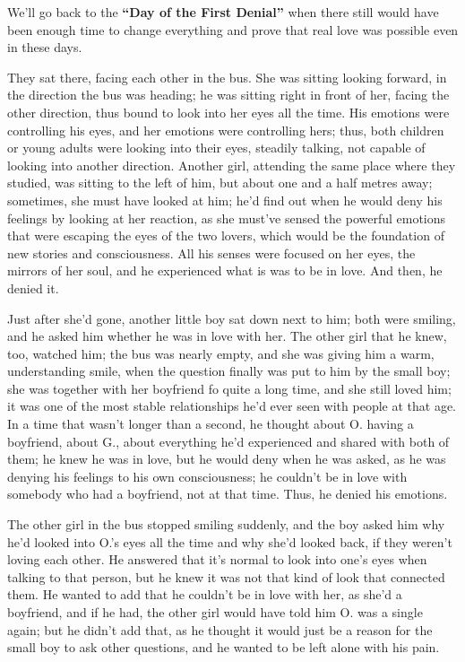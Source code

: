 We'll go back to the \textbf{\enquote{Day of the First Denial}} when there still would have been enough time to change everything and prove that real love was possible even in these days.

They sat there, facing each other in the bus. She was sitting looking forward, in the direction the bus was heading; he was sitting right in front of her, facing the other direction, thus bound to look into her eyes all the time. His emotions were controlling his eyes, and her emotions were controlling hers; thus, both children or young adults were looking into their eyes, steadily talking, not capable of looking into another direction. Another girl, attending the same place where they studied, was sitting to the left of him, but about one and a half metres away; sometimes, she must have looked at him; he'd find out when he would deny his feelings by looking at her reaction, as she must've sensed the powerful emotions that were escaping the eyes of the two lovers, which would be the foundation of new stories and consciousness. All his senses were focused on her eyes, the mirrors of her soul, and he experienced what is was to be in love.
And then, he denied it.

Just after she'd gone, another little boy sat down next to him; both were smiling, and he asked him whether he was in love with her. The other girl that he knew, too, watched him; the bus was nearly empty, and she was giving him a warm, understanding smile, when the question finally was put to him by the small boy; she was together with her boyfriend fo quite a long time, and she still loved him; it was one of the most stable relationships he'd ever seen with people at that age. In a time that wasn't longer than a second, he thought about O. having a boyfriend, about G., about everything he'd experienced and shared with both of them; he knew he was in love, but he would deny when he was asked, as he was denying his feelings to his own consciousness; he couldn't be in love with somebody who had a boyfriend, not at that time.
Thus, he denied his emotions.

The other girl in the bus stopped smiling suddenly, and the boy asked him why he'd looked into O.'s eyes all the time and why she'd looked back, if they weren't loving each other.
He answered that it's normal to look into one's eyes when talking to that person, but he knew it was not that kind of look that connected them. He wanted to add that he couldn't be in love with her, as she'd a boyfriend, and if he had, the other girl would have told him O. was a single again; but he didn't add that, as he thought it would just be a reason for the small boy to ask other questions, and he wanted to be left alone with his pain.


